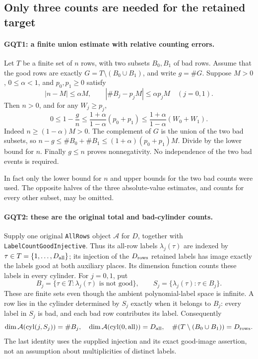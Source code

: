 \documentclass[11pt,a4paper]{article}
\numberwithin{equation}{section}
\theoremstyle{remark}\newtheorem{remark}[theorem]{Remark}
\begin{document}
\subsection{Only three counts are needed for the retained target}

\paragraph{GQT1: a finite union estimate with relative counting errors.}
\label{claim:GQT1}
Let $T$ be a finite set of $n$ rows, with two subsets $B_0,\allowbreak{} B_1$ of
bad rows. Assume that the good rows are exactly
$G=T\setminus(B_0\cup B_1)$, and write $g=\#G$.
Suppose $M>0$, $0\le\alpha<1$, and $p_0,\allowbreak{} p_1\ge0$ satisfy
\[
 |n-M|\le\alpha M,\qquad
 |\#B_j-p_jM|\le\alpha p_jM\quad(j=0,1).
\]
Then $n>0$, and for any $W_j\ge p_j$,
\begin{equation}\label{eq:gqt-three-counts}
 0\le1-\frac gn
       \le\frac{1+\alpha}{1-\alpha}(p_0+p_1)
       \le\frac{1+\alpha}{1-\alpha}(W_0+W_1).
\end{equation}
Indeed $n\ge(1-\alpha)M>0$. The complement of $G$ is the union
of the two bad subsets, so $n-g\le\#B_0+\#B_1
\le(1+\alpha)(p_0+p_1)M$. Divide by the lower bound for $n$.
Finally $g\le n$ proves nonnegativity. No independence of the two
bad events is required.

In fact only the lower bound for $n$ and upper bounds for the two
bad counts were used. The opposite halves of the three absolute-value
estimates, and counts for every other subset, may be omitted.

\paragraph{GQT2: these are the original total and bad-cylinder counts.}
\label{claim:GQT2}
Supply one original \texttt{All\allowbreak Rows} object $\mathcal A$ for $D$,
together with \texttt{Label\allowbreak Count\allowbreak Good\allowbreak Injective}. Thus its all-row
labels $\lambda_j(\tau)$ are indexed by
$\tau\in T=\{1,\ldots,\allowbreak{} D_{\rm all}\}$; its injection of the
$D_{\rm rows}$ retained labels has image exactly the labels good
at both auxiliary places. Its dimension function counts these
labels in every cylinder. For $j=0,1$, put
\[
 B_j=\{\tau\in T:\lambda_j(\tau)\text{ is not good}\},
 \qquad S_j=\{\lambda_j(\tau):\tau\in B_j\}.
\]
These are finite sets even though the ambient polynomial-label space
is infinite. A row lies in the cylinder determined by $S_j$ exactly
when it belongs to $B_j$: every label in $S_j$ is bad, and each bad
row contributes its label. Consequently
\[
 \dim\mathcal A(\mathrm{cyl}(j,\allowbreak{} S_j))=\#B_j,
 \quad \dim\mathcal A(\mathrm{cyl}(0,\mathrm{all}))=D_{\rm all},
 \quad\#(T\setminus(B_0\cup B_1))=D_{\rm rows}.
\]
The last identity uses the supplied injection and its exact
good-image assertion, not an assumption about multiplicities of
distinct labels.
\end{document}
